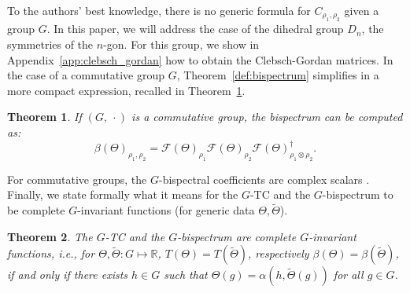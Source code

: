 \documentclass{article}
\theoremstyle{plain}
\newtheorem{theorem}{Theorem}[section]
\theoremstyle{definition}
\theoremstyle{remark}
\begin{document}
To the authors' best knowledge, there is no generic formula for $C_{\rho_1,\rho_2}$ given a group $G$. In this paper, we will address the case of the dihedral group $D_n$, the symmetries of the $n$-gon. For this group, we show in Appendix~\ref{app:clebsch_gordan} how to obtain the Clebsch-Gordan matrices.
In the case of a commutative group $G$, Theorem~\ref{def:bispectrum} simplifies in a more compact expression, recalled in Theorem~\ref{thm:commutative_bispectrum}.
\begin{theorem}{\cite{kakarala_finite_groups}}\label{thm:commutative_bispectrum}
    If $(G,\ \cdot)$ is a commutative group, the bispectrum can be computed as:
    \begin{equation}\label{eq:com_bsp}
        \beta(\Theta)_{\rho_1,\rho_2} = \mathcal{F}(\Theta)_{\rho_1}\mathcal{F}(\Theta)_{\rho_2}\mathcal{F}(\Theta)_{\rho_1\otimes\rho_2}^\dagger.
    \end{equation}
\end{theorem}
For commutative groups, the $G$-bispectral coefficients are complex scalars \cite{steinberg2011representation}. Finally, we state formally what it means for the $G$-TC and the $G$-bispectrum to be complete $G$-invariant functions (for generic data $\Theta, \widetilde{\Theta}$).
\begin{theorem}{\cite{Kakarala2009CompletenessOB}}
    \label{thm:bsp_invariance}
    The $G$-TC and the $G$-bispectrum are complete $G$-invariant functions, i.e., for $\Theta, \widetilde{\Theta}:G\mapsto\mathbb{R}$, $T(\Theta)=T(\widetilde{\Theta})$, respectively  $\beta(\Theta) = \beta(\widetilde{\Theta})$, if and only if there exists $h\in G$ such that $\Theta(g) = \alpha(h, \widetilde{\Theta}(g))$ for all $g\in G$.
\end{theorem}
\end{document}
